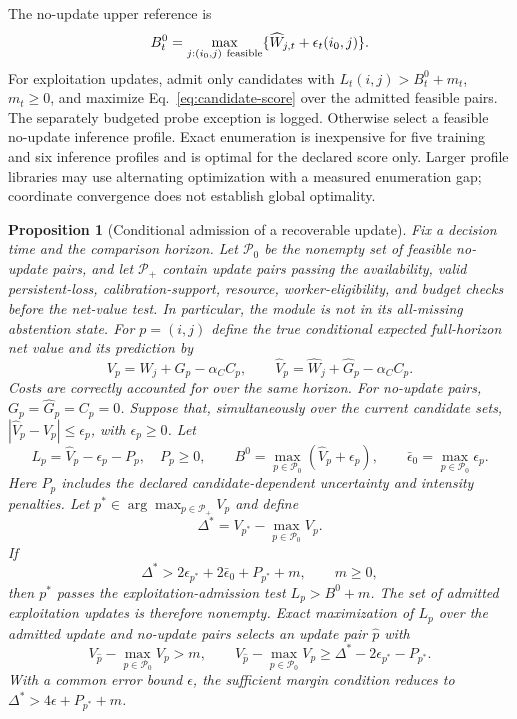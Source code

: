 \documentclass[10pt]{article}
\newtheorem{proposition}{Proposition}
\begin{document}
The no-update upper reference is
\begin{equation}
 B_t^0=\max_{j:(i_0,j)\ \rm feasible}
       \{\widehat W_{j,t}+\epsilon_t(i_0,j)\}.
\end{equation}
For exploitation updates, admit only candidates with
$L_t(i,j)>B_t^0+m_t$, $m_t\ge0$, and maximize Eq.~\eqref{eq:candidate-score}
over the admitted feasible pairs. The separately budgeted probe exception is
logged. Otherwise select a feasible no-update inference profile. Exact
enumeration is inexpensive for five training and six inference profiles and
is optimal for the declared score only. Larger profile libraries may use
alternating optimization with a measured enumeration gap; coordinate convergence
does not establish global optimality.

\begin{proposition}[Conditional admission of a recoverable update]
\label{prop:conditional-recoverability}
Fix a decision time and the comparison horizon. Let $\mathcal P_0$ be the
nonempty set of feasible no-update pairs, and let $\mathcal P_+$ contain update
pairs passing the availability, valid persistent-loss, calibration-support,
resource, worker-eligibility, and budget checks \emph{before} the net-value
test. In particular, the module is not in its all-missing abstention state.
For $p=(i,j)$ define the true conditional expected full-horizon net value and
its prediction by
\[
 V_p=W_j+G_p-\alpha_C C_p,\qquad
 \widehat V_p=\widehat W_j+\widehat G_p-\alpha_C C_p.
\]
Costs are correctly accounted for over the same horizon. For no-update pairs,
$G_p=\widehat G_p=C_p=0$. Suppose that, simultaneously over the current
candidate sets, $|\widehat V_p-V_p|\le\epsilon_p$, with $\epsilon_p\ge0$.
Let
\[
 L_p=\widehat V_p-\epsilon_p-P_p,\quad P_p\ge0,\qquad
 B^0=\max_{p\in\mathcal P_0}(\widehat V_p+\epsilon_p),
 \qquad \bar\epsilon_0=\max_{p\in\mathcal P_0}\epsilon_p.
\]
Here $P_p$ includes the declared candidate-dependent uncertainty and intensity
penalties. Let $p^*\in\arg\max_{p\in\mathcal P_+}V_p$ and define
\[
 \Delta^*=V_{p^*}-\max_{p\in\mathcal P_0}V_p.
\]
If
\begin{equation}
 \Delta^*>2\epsilon_{p^*}+2\bar\epsilon_0+P_{p^*}+m,
 \qquad m\ge0,
 \label{eq:conditional-recovery-margin}
\end{equation}
then $p^*$ passes the exploitation-admission test $L_p>B^0+m$.
The set of admitted exploitation updates is therefore nonempty. Exact
maximization of $L_p$ over the admitted update and no-update pairs selects an
update pair $\widehat p$ with
\[
 V_{\widehat p}-\max_{p\in\mathcal P_0}V_p>m,
 \qquad
 V_{\widehat p}-\max_{p\in\mathcal P_0}V_p
 \ge\Delta^*-2\epsilon_{p^*}-P_{p^*}.
\]
With a common error bound $\epsilon$, the sufficient margin condition reduces
to $\Delta^*>4\epsilon+P_{p^*}+m$.
\end{proposition}
\end{document}
